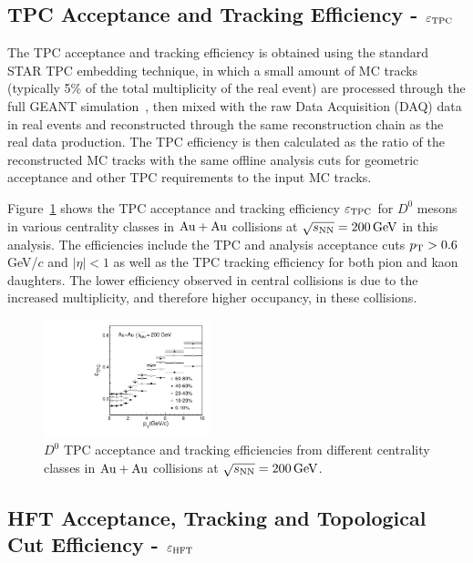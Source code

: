 \documentclass[%
 reprint,	
 amsmath,amssymb,
 aps,
 prc,
]{revtex4-1}
\begin{document}
\subsection{\label{sec:correction:tpc}TPC Acceptance and Tracking Efficiency - $\varepsilon_{\rm TPC}$}

The TPC acceptance and tracking efficiency is obtained using the standard STAR TPC embedding technique, in which a small amount of MC tracks (typically 5\% of the total multiplicity of the real event) are processed through the full GEANT simulation~\cite{GEANT4}, then mixed with the raw Data Acquisition (DAQ) data in real events and reconstructed through the same reconstruction chain as the real data production. The TPC efficiency is then calculated as the ratio of the reconstructed MC tracks with the same offline analysis cuts for geometric acceptance and other TPC requirements to the input MC tracks.

Figure~\ref{fig:Datad0Eff_tpc} shows the TPC acceptance and tracking efficiency $\varepsilon_{\rm TPC}$ for $D^0$ mesons in various centrality classes in ${\rm{Au + Au}}$ collisions at ${\sqrt{s_{\rm NN}} = \rm{200\,GeV}}$ in this analysis. The efficiencies include the TPC and analysis acceptance cuts $p_{\rm T}>0.6$\,GeV/$c$ and $|\eta|<1$ as well as the TPC tracking efficiency for both pion and kaon daughters. The lower efficiency observed in central collisions is due to the increased multiplicity, and therefore higher occupancy, in these collisions.

\begin{figure}
\centering
\includegraphics[width=0.43\textwidth]{fig/Datad0Eff_tpc_10.pdf}
  \caption{$D^{0}$ TPC acceptance and tracking efficiencies from different centrality classes in ${\rm{Au + Au}}$ collisions at ${\sqrt{s_{\rm NN}} = \rm{200\,GeV}}$.}
\label{fig:Datad0Eff_tpc} 
\end{figure}


\subsection{\label{sec:correction:hft}HFT Acceptance, Tracking and Topological Cut Efficiency - $\varepsilon_{\rm HFT}$}
\end{document}
